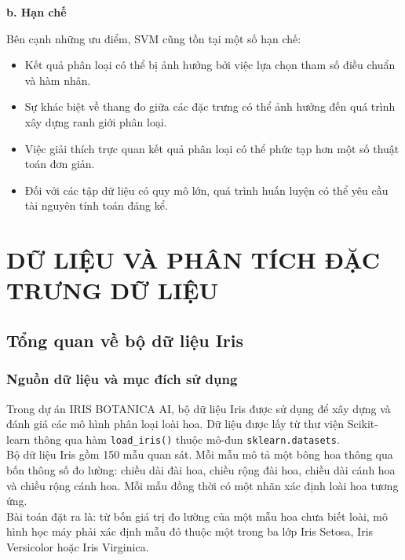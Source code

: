 \documentclass[14pt]{extarticle}
\begin{document}
		\textbf{ b. Hạn chế}
		
		\noindent
		Bên cạnh những ưu điểm, SVM cũng tồn tại một số hạn chế:
		
		\begin{itemize}
			\item Kết quả phân loại có thể bị ảnh hưởng bởi việc lựa chọn tham số điều chuẩn và hàm nhân.
			\item Sự khác biệt về thang đo giữa các đặc trưng có thể ảnh hưởng đến quá trình xây dựng ranh giới phân loại.
			\item Việc giải thích trực quan kết quả phân loại có thể phức tạp hơn một số thuật toán đơn giản.
			\item Đối với các tập dữ liệu có quy mô lớn, quá trình huấn luyện có thể yêu cầu tài nguyên tính toán đáng kể.
		\end{itemize}
		
	\newpage 
	
	\section{DỮ LIỆU VÀ PHÂN TÍCH ĐẶC TRƯNG DỮ LIỆU}
	\subsection{Tổng quan về bộ dữ liệu Iris}
	
	\subsubsection{Nguồn dữ liệu và mục đích sử dụng}
	
		\noindent Trong dự án IRIS BOTANICA AI, bộ dữ liệu Iris được sử dụng để xây dựng và đánh giá các mô hình phân loại loài hoa. Dữ liệu được lấy từ thư viện Scikit-learn thông qua hàm \texttt{load\_iris()} thuộc mô-đun \texttt{sklearn.datasets}.\\
	
		\noindent Bộ dữ liệu Iris gồm 150 mẫu quan sát. Mỗi mẫu mô tả một bông hoa thông qua bốn thông số đo lường: chiều dài đài hoa, chiều rộng đài hoa, chiều dài cánh hoa và chiều rộng cánh hoa. Mỗi mẫu đồng thời có một nhãn xác định loài hoa tương ứng.\\
	
		\noindent Bài toán đặt ra là: từ bốn giá trị đo lường của một mẫu hoa chưa biết loài, mô hình học máy phải xác định mẫu đó thuộc một trong ba lớp Iris Setosa, Iris Versicolor hoặc Iris Virginica.\\
	
\end{document}
